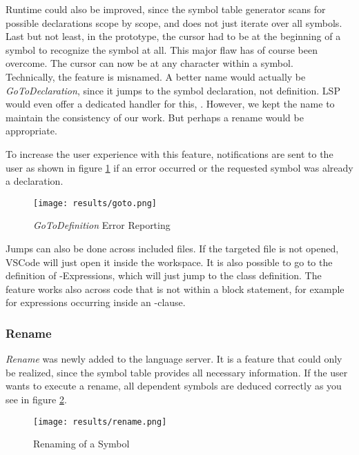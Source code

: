 Runtime could also be improved, since the symbol table generator scans for possible declarations scope by scope, and  does not just iterate over all symbols.
Last but not least, in the prototype, the cursor had to be at the beginning of a symbol to recognize the symbol at all.
This major flaw has of course been overcome.
The cursor can now be at any character within a symbol.\\

Technically, the feature is misnamed.
A better name would actually be \textit{GoToDeclaration}, since it jumps to the symbol declaration, not definition.
LSP would even offer a dedicated handler for this, \linebreak {} \cite{lspspec}.
However, we kept the name to maintain the consistency of our work.
But perhaps a rename would be appropriate.

To increase the user experience with this feature, notifications are sent to the user
as shown in figure \ref{fig:goto}
if an error occurred or the requested symbol was already a declaration.
\begin{figure}[H]
    \centering
    \texttt{[image: results/goto.png]}
    \caption{\textit{GoToDefinition} Error Reporting}
    \label{fig:goto}
\end{figure}

Jumps can also be done across included files.
If the targeted file is not opened, VSCode will just open it inside the workspace.
It is also possible to go to the definition of -Expressions, which will just jump to the class definition.
The feature works also across code that is not within a block statement, for example for expressions occurring inside an -clause.

\subsubsection{Rename}
\textit{Rename} was newly added to the language server.
It is a feature that could only be realized, since the symbol table provides all necessary information.
If the user wants to execute a rename, all dependent symbols are deduced correctly as you see in figure \ref{fig:rename}.

\begin{figure}[H]
    \centering
    \texttt{[image: results/rename.png]}
    \caption{Renaming of a Symbol}
    \label{fig:rename}
\end{figure}

